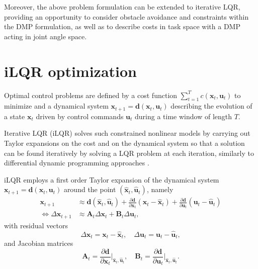 \documentclass[10pt,a4paper]{article} %
\begin{document}
Moreover, the above problem formulation can be extended to iterative LQR, providing an opportunity to consider obstacle avoidance and constraints within the DMP formulation, as well as to describe costs in task space with a DMP acting in joint angle space. 

\newpage

\section{iLQR optimization}

Optimal control problems are defined by a cost function $\sum_{t=1}^T c(\bm{x}_t,\bm{u}_t)$ to minimize and a dynamical system $\bm{x}_{t+1} = \bm{d}(\bm{x}_t,\bm{u}_t)$ describing the evolution of a state $\bm{x}_t$ driven by control commands $\bm{u}_t$ during a time window of length $T$.

Iterative LQR (iLQR) \cite{Li04} solves such constrained nonlinear models by carrying out Taylor expansions on the cost and on the dynamical system so that a solution can be found iteratively by solving a LQR problem at each iteration, similarly to differential dynamic programming approaches \cite{Mayne66,Rosenbrock72}.

iLQR employs a first order Taylor expansion of the dynamical system $\bm{x}_{t+1} = \bm{d}(\bm{x}_t,\bm{u}_t)$ around the point $(\bm{\hat{x}}_t, \bm{\hat{u}}_t)$, namely
\begin{align}
	\bm{x}_{t+1} &\approx \bm{d}(\bm{\hat{x}}_t,\bm{\hat{u}}_t) + \frac{\partial\bm{d}}{\partial\bm{x}_t} (\bm{x}_t-\bm{\hat{x}}_t) + \frac{\partial\bm{d}}{\partial\bm{u}_t} (\bm{u}_t-\bm{\hat{u}}_t) \nonumber\\
	\iff \Delta\bm{x}_{t+1} &\approx \bm{A}_t \Delta\bm{x}_t + \bm{B}_t \Delta\bm{u}_t,
	\label{eq:DS}
\end{align}
with residual vectors 
\begin{equation*}
	\Delta\bm{x}_t \!=\! \bm{x}_t \!-\! \bm{\hat{x}}_t, \quad
	\Delta\bm{u}_t \!=\! \bm{u}_t \!-\! \bm{\hat{u}}_t, 
\end{equation*}
and Jacobian matrices 
\begin{equation*}
\bm{A}_t = \frac{\partial\bm{d}}{\partial\bm{x}_t}\Big|_{\bm{\hat{x}}_t,\bm{\hat{u}}_t}, \quad 
\bm{B}_t = \frac{\partial\bm{d}}{\partial\bm{u}_t}\Big|_{\bm{\hat{x}}_t,\bm{\hat{u}}_t}.
\end{equation*}
\end{document}
